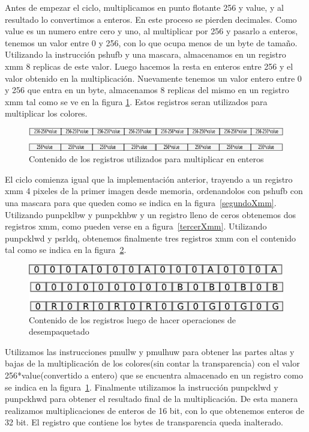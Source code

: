 \documentclass[a4paper]{article}
\begin{document}
Antes de empezar el ciclo, multiplicamos en punto flotante 256 y value, y al resultado lo convertimos a enteros. En este proceso se pierden decimales. Como value es un numero entre cero y uno, al multiplicar por 256 y pasarlo a enteros, tenemos un valor entre 0 y 256, con lo que ocupa menos de un byte de tamaño. Utilizando la instrucción pshufb y una mascara, almacenamos en un registro xmm 8 replicas de este valor. Luego hacemos la resta en enteros entre 256 y el valor obtenido en la multiplicación. Nuevamente tenemos un valor entero entre 0 y 256 que entra en un byte, almacenamos 8 replicas del mismo en un registro xmm tal como se ve en la figura \ref{256value}. Estos registros seran utilizados para multiplicar los colores.

\begin{figure}[H]
\centering
\includegraphics[scale=0.8]{imagenes/256value.png}
\caption{Contenido de los registros utilizados para multiplicar en enteros}
\label{256value}
\end{figure}

El ciclo comienza igual que la implementación anterior, trayendo a un registro xmm 4 pixeles de la primer imagen desde memoria, ordenandolos con pshufb con una mascara para que queden como se indica en la figura~\ref{segundoXmm}. Utilizando punpcklbw y punpckhbw y un registro lleno de ceros obtenemos dos registros xmm, como pueden verse en a figura~\ref{tercerXmm}. Utilizando punpcklwd y psrldq, obtenemos finalmente tres registros xmm con el contenido tal como se indica en la figura~\ref{xmmAsm2}.

\begin{figure}[H]
\centering
\includegraphics[scale=0.8]{imagenes/xmmAsm2.png}
\caption{Contenido de los registros luego de hacer operaciones de desempaquetado}
\label{xmmAsm2}
\end{figure}


Utilizamos las instrucciones pmullw y pmulhuw para obtener las partes altas y bajas de la multiplicación de los colores(sin contar la transparencia) con el valor 256*value(convertido a entero) que se encuentra almacenado en un registro como se indica en la figura~\ref{256value}. Finalmente utilizamos la instrucción punpcklwd y punpckhwd para obtener el resultado final de la multiplicación. De esta manera realizamos multiplicaciones de enteros de 16 bit, con lo que obtenemos enteros de 32 bit. El registro que contiene los bytes de transparencia queda inalterado.
\end{document}

